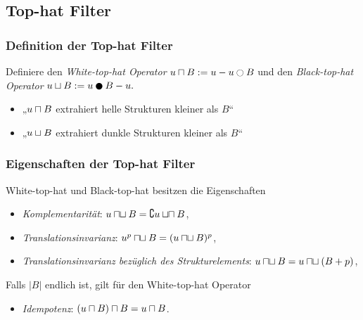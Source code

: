 \documentclass{beamer}
\begin{document}
\subsection{Top-hat Filter}

\begin{frame}
    \frametitle{Definition der Top-hat Filter}
    \pause
    \begin{definition}
        Definiere den \emph{White-top-hat Operator}
        \begin{math}
            u \wtophat B := u - u \open B
        \end{math}
        und den \emph{Black-top-hat Operator}
        \begin{math}
            u \btophat B := u \close B - u.
        \end{math}
    \end{definition}
    \pause
    \begin{itemize}
        \item
            „$u \sqcap B$ extrahiert helle Strukturen kleiner als $B$“
        \item
            „$u \sqcup B$ extrahiert dunkle Strukturen kleiner als $B$“
    \end{itemize}
\end{frame}

\begin{frame}
    \frametitle{Eigenschaften der Top-hat Filter}
    \begin{definition}
        White-top-hat und Black-top-hat besitzen die Eigenschaften
        \begin{itemize}
            \item
                \emph{Komplementarität}: $u \mathbin{\sqcap\mkern-1mu\sqcup} B = \complement u \mathbin{\sqcup\mkern-1mu\sqcap} B$,
            \item
                \emph{Translationsinvarianz}: $u^p \mathbin{\sqcap\mkern-1mu\sqcup} B = (u \mathbin{\sqcap\mkern-1mu\sqcup} B)^p$,
            \item
                \emph{Translationsinvarianz bezüglich des Strukturelements}: $u \mathbin{\sqcap\mkern-1mu\sqcup} B = u \mathbin{\sqcap\mkern-1mu\sqcup} (B + p)$,
        \end{itemize}
        Falls $|B|$ endlich ist, gilt für den White-top-hat Operator
        \begin{itemize}
            \item
                \emph{Idempotenz}: $(u \sqcap B) \sqcap B = u \sqcap B$.
        \end{itemize}
    \end{definition}
\end{frame}
\end{document}
